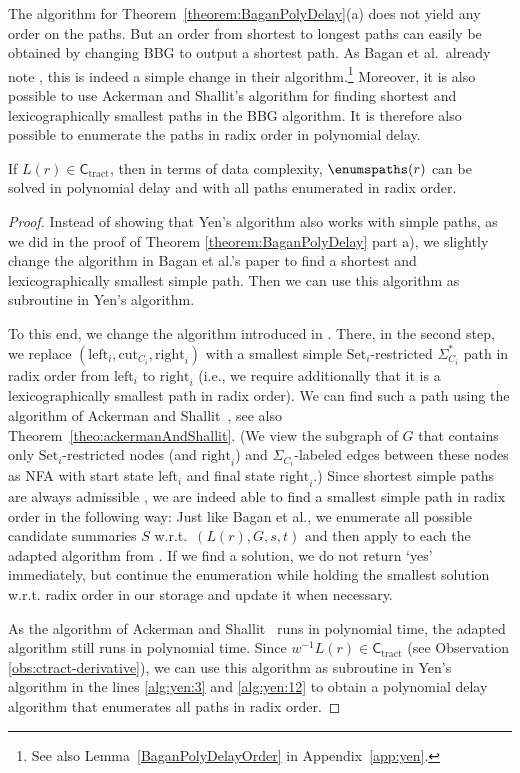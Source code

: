 \documentclass[a4paper,english]{lipics-v2016}
\newcommand{\ctract}{\ensuremath{\textsf{C}_\text{tract}}\xspace}
\theoremstyle{plain}
\begin{document}
The algorithm for Theorem~\ref{theorem:BaganPolyDelay}(a) does not yield any order on
the paths.  But an order from shortest to longest paths can easily be
obtained by changing BBG to output a shortest path. As Bagan et al.\
already note \cite[Section 3.2]{bagan}, this is indeed a simple change
in their algorithm.\footnote{See also Lemma~\ref{BaganPolyDelayOrder} in Appendix~\ref{app:yen}.} 
Moreover, it is also possible to use Ackerman and Shallit's algorithm \cite{Ackerman-TCS09} 
for finding shortest and lexicographically smallest paths in the BBG
algorithm. It is therefore also possible to enumerate the paths in
radix order in polynomial delay.

     


\begin{lemma}\label{BaganPolyDelayOrder}
   If $L(r) \in \ctract$, then 
   in terms of data complexity, $\enumspaths(r)$ can be solved in
   polynomial delay and with all paths enumerated in radix order.
\end{lemma}
\begin{proof}
Instead of showing that Yen's algorithm also works with simple paths, as we did in the proof of Theorem \ref{theorem:BaganPolyDelay} part a), we slightly
change the algorithm in Bagan et al.'s paper
  \cite{bagan} to find a shortest and lexicographically smallest simple path. Then we can use this algorithm as subroutine in Yen's algorithm.

To this end, we change the algorithm introduced in \cite[Lemma 15]{bagan}. There, in the second step, we replace $(\text{left}_i,\text{cut}_{C_i}, \text{right}_i)$ with a smallest simple $\text{Set}_i$-restricted $\Sigma^*_{C_i}$ path in radix order from $\text{left}_i$ to $\text{right}_i$ (i.e., we require additionally that it is a lexicographically smallest path in radix order). We can find such a path using the algorithm of Ackerman and Shallit~\cite{Ackerman-TCS09}, see also Theorem~\ref{theo:ackermanAndShallit}. (We view the subgraph of $G$ that contains only $\text{Set}_i$-restricted nodes (and $\text{right}_i$) and $\Sigma_{C_i}$-labeled edges between these nodes as NFA with start state $\text{left}_i$ and final state $\text{right}_i$.) Since shortest simple paths are always admissible \cite[Lemma 13]{bagan}, we are indeed able to find a smallest simple path in radix order in the following way: 
Just like Bagan et al., we enumerate all possible candidate summaries $S$ w.r.t.\ $(L(r),G,s,t)$ and then apply to each the adapted algorithm from \cite[Lemma 15]{bagan}. If we find a solution, we do not return `yes' immediately, but continue the enumeration while holding the smallest solution w.r.t. radix order in our storage and update it when necessary.
 
As the algorithm of Ackerman and Shallit~\cite{Ackerman-TCS09} runs in polynomial time, the adapted algorithm \cite[Lemma 15]{bagan} still runs in polynomial time. Since $w^{-1}L(r) \in \ctract$ (see Observation \ref{obs:ctract-derivative}), we can use this algorithm as subroutine in Yen's algorithm in the lines \ref{alg:yen:3} and \ref{alg:yen:12} to obtain a polynomial delay algorithm that enumerates all paths in radix order.
\end{proof}
\end{document}
